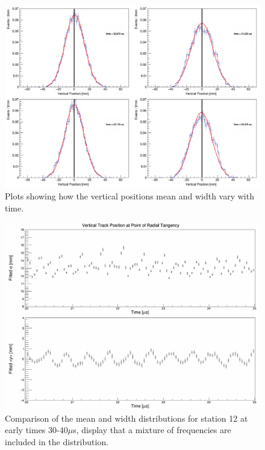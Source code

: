 \begin{figure}[ht]
\centering 
\includegraphics[scale=0.5]{Figures/verticalpositions.png}
\decoRule
\caption{Plots showing how the vertical positions mean and width vary with time.}
\label{fig:verticalpositions.png}
\end{figure}

\begin{figure}[ht]
\centering 
\includegraphics[scale=0.2]{Figures/Width_mean_comparison_station12.png}
\decoRule
\caption{Comparison of the mean and width distributions for station 12 at early times 30-40$\mu$s, display that a mixture of frequencies are included in the distribution.}
\label{fig:Width_mean_comparison_station12}
\end{figure}

